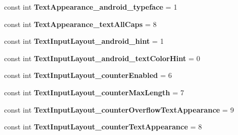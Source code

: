 \begin{DoxyCompactItemize}
const int {\bfseries Text\+Appearance\+\_\+android\+\_\+typeface} = 1
\item 
\mbox{\label{class_sample_app_1_1_droid_1_1_resource_1_1_styleable_af7bc41535ccc3cd68fe0eccb72450b60}} 
const int {\bfseries Text\+Appearance\+\_\+text\+All\+Caps} = 8
\item 
\mbox{\label{class_sample_app_1_1_droid_1_1_resource_1_1_styleable_a982d4c2e74a8a8b6f788f4459d728519}} 
const int {\bfseries Text\+Input\+Layout\+\_\+android\+\_\+hint} = 1
\item 
\mbox{\label{class_sample_app_1_1_droid_1_1_resource_1_1_styleable_a1eb3103d97a11b2fbd2b4f6ce41bcb97}} 
const int {\bfseries Text\+Input\+Layout\+\_\+android\+\_\+text\+Color\+Hint} = 0
\item 
\mbox{\label{class_sample_app_1_1_droid_1_1_resource_1_1_styleable_a891ed7fbdc75e90dabbaf51577f037af}} 
const int {\bfseries Text\+Input\+Layout\+\_\+counter\+Enabled} = 6
\item 
\mbox{\label{class_sample_app_1_1_droid_1_1_resource_1_1_styleable_a1e03e79ecbd6fe5bf759a8b27e348432}} 
const int {\bfseries Text\+Input\+Layout\+\_\+counter\+Max\+Length} = 7
\item 
\mbox{\label{class_sample_app_1_1_droid_1_1_resource_1_1_styleable_a028b20750418b49e9a70b5643cdf1922}} 
const int {\bfseries Text\+Input\+Layout\+\_\+counter\+Overflow\+Text\+Appearance} = 9
\item 
\mbox{\label{class_sample_app_1_1_droid_1_1_resource_1_1_styleable_af5923acd4e1a399b3d2574b980983555}} 
const int {\bfseries Text\+Input\+Layout\+\_\+counter\+Text\+Appearance} = 8
\item 
\mbox{\label{class_sample_app_1_1_droid_1_1_resource_1_1_styleable_a0c373a7be4b5596895745d9cb45f5d0c}} 

\end{DoxyCompactItemize}
